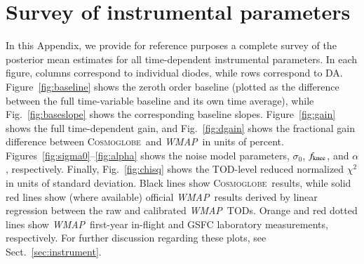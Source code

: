 \documentclass[twocolumn]{../../common/aa}
\def\WMAP{\emph{WMAP}}
\def\COBE{\emph{COBE}}
\newcommand{\cosmoglobe}{\textsc{Cosmoglobe}}
\begin{document}



















\appendix

\section{Survey of instrumental parameters}
\label{sec:survey}

\noindent\begin{minipage}{\textwidth}
In this Appendix, we provide for reference purposes a complete survey of the posterior mean estimates for all time-dependent instrumental parameters. In each figure, columns correspond to individual diodes, while rows correspond to DA. Figure~\ref{fig:baseline} shows the zeroth order baseline (plotted as the difference between the full time-variable baseline and its own time average), while Fig.~\ref{fig:baseslope} shows the corresponding baseline slopes. Figure~\ref{fig:gain} shows the full time-dependent gain, and Fig.~\ref{fig:dgain} shows the fractional gain difference between \cosmoglobe\ and \WMAP\ in units of percent. Figures~\ref{fig:sigma0}--\ref{fig:alpha} shows the noise model parameters, $\sigma_0$, $\fknee$, and $\alpha$, respectively. Finally, Fig.~\ref{fig:chisq} shows the TOD-level reduced normalized $\chi^2$ in units of standard deviation. Black lines show \cosmoglobe\ results, while solid red lines show (where available) official \WMAP\ results derived by linear regression between the raw and calibrated \WMAP\ TODs. Orange and red dotted lines show \WMAP\ first-year in-flight and GSFC laboratory measurements, respectively. For further discussion regarding these plots, see Sect.~\ref{sec:instrument}.
\end{minipage}
\end{document}
